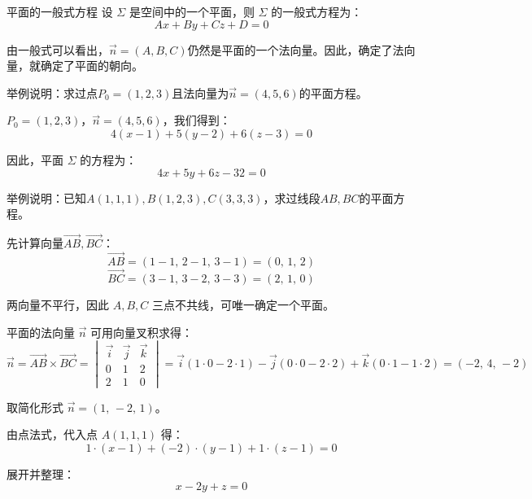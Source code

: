 \begin{definition}{平面的一般式方程}{}
设 $\Sigma$ 是空间中的一个平面，则 $\Sigma$ 的一般式方程为：
$$Ax + By + Cz + D = 0$$
\end{definition}

由一般式可以看出，$\vec{n} = (A,B,C)$仍然是平面的一个法向量。因此，确定了法向量，就确定了平面的朝向。

\begin{myexample}
举例说明：求过点$P_0=(1,2,3)$且法向量为$\vec{n}=(4,5,6)$的平面方程。

$P_0=(1,2,3)$，$\vec{n}=(4,5,6)$，我们得到：
\[
4(x-1)+5(y-2)+6(z-3)=0
\]

因此，平面 $\Sigma$ 的方程为：
\[
4x+5y+6z-32=0
\]
\end{myexample}

\begin{myexample}
举例说明：已知$A(1,1,1),B(1,2,3),C(3,3,3)$，求过线段$AB,BC$的平面方程。

先计算向量$\overrightarrow{AB},\overrightarrow{BC}$：
\[
\overrightarrow{AB} = (1-1,\,2-1,\,3-1) = (0,\,1,\,2)
\]
\[
\overrightarrow{BC} = (3-1,\,3-2,\,3-3) = (2,\,1,\,0)
\]

两向量不平行，因此 $A,B,C$ 三点不共线，可唯一确定一个平面。

平面的法向量 $\vec{n}$ 可用向量叉积求得：
\[
\vec{n} = \overrightarrow{AB} \times \overrightarrow{BC}
= \begin{vmatrix}
\vec{i} & \vec{j} & \vec{k} \\
0 & 1 & 2 \\
2 & 1 & 0
\end{vmatrix}
= \vec{i}(1\cdot0 - 2\cdot1) - \vec{j}(0\cdot0 - 2\cdot2) + \vec{k}(0\cdot1 - 1\cdot2)
= (-2,\,4,\,-2)
\]

取简化形式 $\vec{n} = (1,\,-2,\,1)$。

由点法式，代入点 $A(1,1,1)$ 得：
\[
1\cdot(x-1) + (-2)\cdot(y-1) + 1\cdot(z-1) = 0
\]

展开并整理：
\[
x - 2y + z = 0
\]

\begin{center}
\end{center}
\end{myexample}

